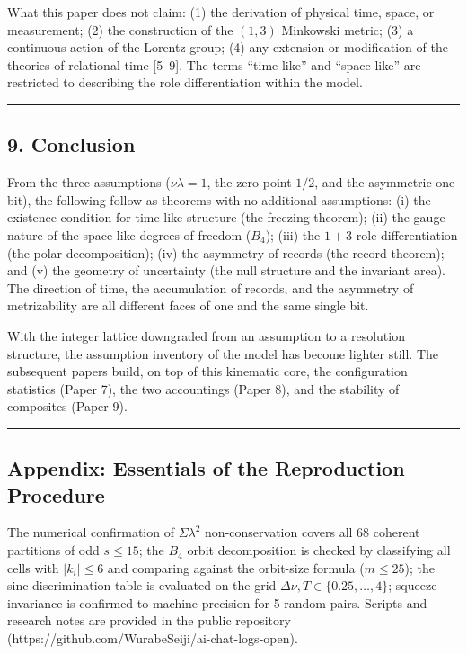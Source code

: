 \documentclass[
]{ltjsarticle}
\begin{document}
What this paper does not claim: (1) the derivation of physical time,
space, or measurement; (2) the construction of the \((1,3)\) Minkowski
metric; (3) a continuous action of the Lorentz group; (4) any extension
or modification of the theories of relational time {[}5--9{]}. The terms
``time-like'' and ``space-like'' are restricted to describing the role
differentiation within the model.

\begin{center}\rule{0.5\linewidth}{0.5pt}\end{center}

\subsection{9. Conclusion}\label{conclusion}

From the three assumptions (\(\nu\lambda=1\), the zero point \(1/2\),
and the asymmetric one bit), the following follow as theorems with no
additional assumptions: (i) the existence condition for time-like
structure (the freezing theorem); (ii) the gauge nature of the
space-like degrees of freedom (\(B_4\)); (iii) the \(1{+}3\) role
differentiation (the polar decomposition); (iv) the asymmetry of records
(the record theorem); and (v) the geometry of uncertainty (the null
structure and the invariant area). The direction of time, the
accumulation of records, and the asymmetry of metrizability are all
different faces of one and the same single bit.

With the integer lattice downgraded from an assumption to a resolution
structure, the assumption inventory of the model has become lighter
still. The subsequent papers build, on top of this kinematic core, the
configuration statistics (Paper 7), the two accountings (Paper 8), and
the stability of composites (Paper 9).

\begin{center}\rule{0.5\linewidth}{0.5pt}\end{center}

\subsection{Appendix: Essentials of the Reproduction
Procedure}\label{appendix-essentials-of-the-reproduction-procedure}

The numerical confirmation of \(\Sigma\lambda^2\) non-conservation
covers all 68 coherent partitions of odd \(s\le15\); the \(B_4\) orbit
decomposition is checked by classifying all cells with \(|k_i|\le6\) and
comparing against the orbit-size formula (\(m\le25\)); the sinc
discrimination table is evaluated on the grid
\(\Delta\nu, T\in\{0.25,\ldots,4\}\); squeeze invariance is confirmed to
machine precision for 5 random pairs. Scripts and research notes are
provided in the public repository
(https://github.com/WurabeSeiji/ai-chat-logs-open).
\end{document}
